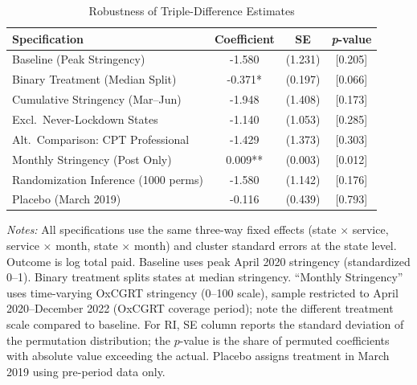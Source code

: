 \begin{table}[htbp]
\centering
\caption{Robustness of Triple-Difference Estimates}
\label{tab:robustness}
\small
\begin{tabular}{lccc}
\hline\hline
Specification & Coefficient & SE & \textit{p}-value \\
\hline
Baseline (Peak Stringency) & -1.580 & (1.231) & [0.205] \\
Binary Treatment (Median Split) & -0.371* & (0.197) & [0.066] \\
Cumulative Stringency (Mar--Jun) & -1.948 & (1.408) & [0.173] \\
Excl.~Never-Lockdown States & -1.140 & (1.053) & [0.285] \\
Alt.~Comparison: CPT Professional & -1.429 & (1.373) & [0.303] \\
Monthly Stringency (Post Only) & 0.009** & (0.003) & [0.012] \\
Randomization Inference (1000 perms) & -1.580 & (1.142) & [0.176] \\
Placebo (March 2019) & -0.116 & (0.439) & [0.793] \\
\hline\hline
\end{tabular}
\begin{minipage}{0.85\textwidth}
\vspace{4pt}
\footnotesize
\textit{Notes:} All specifications use the same three-way fixed effects (state $\times$ service, service $\times$ month, state $\times$ month) and cluster standard errors at the state level. Outcome is log total paid. Baseline uses peak April 2020 stringency (standardized 0--1). Binary treatment splits states at median stringency. ``Monthly Stringency'' uses time-varying OxCGRT stringency (0--100 scale), sample restricted to April 2020--December 2022 (OxCGRT coverage period); note the different treatment scale compared to baseline. For RI, SE column reports the standard deviation of the permutation distribution; the $p$-value is the share of permuted coefficients with absolute value exceeding the actual. Placebo assigns treatment in March 2019 using pre-period data only.
\end{minipage}
\end{table}
